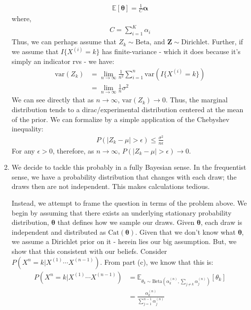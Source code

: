 \documentclass[submit]{harvardml}
\newcommand{\E}{\mathbb{E}}
\newcommand{\var}{\text{var}}
\newcommand{\Dir}{\text{Dirichlet}}
\newcommand{\Cat}{\text{Cat}}
\renewcommand{\v}{\boldsymbol}
\begin{document}
\begin{enumerate}[label=(\alph*)]
	\begin{align*}
		\E \left[ \v{\theta} \right] = \frac{1}{C} \v{\alpha} 
	\end{align*}
	where, 
	\begin{align*}
		C = \sum_{i=1}^K{\alpha_i}
	\end{align*}
Thus, we can perhaps assume that $Z_k \sim \text{Beta}$, and $\v{Z} \sim \Dir$.
Further, if we assume that $I\{X^{(i)} = k \}$ has finite-variance - which it does because it's simply an indicator rvs -  we have:
	\begin{align*}
		\var(Z_k) &= \lim_{n\rightarrow \infty} \frac{1}{n^2} \sum_{i=1}^{n} \var(I\{X^{(i)} = k \}) \\
				&= \lim_{n\rightarrow \infty} \frac{1}{n} \sigma^2
	\end{align*}
	We can see directly that as $n \rightarrow \infty$, $\var(Z_k) \rightarrow 0$. Thus, the marginal distribution tends to a dirac/experimental distribution centered at the mean of the prior. We can formalize by a simple application of the Chebyshev inequality:
	\begin{align*}
		P(\vert Z_k - \mu \vert > \epsilon) \leq \frac{\sigma^2}{n \epsilon}
	\end{align*}
	For any $\epsilon > 0$, therefore, as $n \rightarrow \infty$, $P(\vert Z_k - \mu \vert > \epsilon)  \rightarrow 0$.

	\item We decide to tackle this probably in a fully Bayesian sense. In the frequentist sense, we have a probability distribution that changes with each draw; the draws then are not independent. This makes calculations tedious.

Instead, we attempt to frame the question in terms of the problem above. We begin by assuming that there exists an underlying stationary probability distribution, $\v{\theta}$ that defines how we sample our draws. Given $\v \theta$, each draw is independent and distributed as $\Cat(\v \theta)$. Given that we don't know what $\v{\theta}$, we assume a Dirichlet prior on it - herein lies our big assumption. But, we show that this consistent with our beliefs. Consider $P(X^{n} = k | X^{(1)} \cdots X^{(n-1)})$. From part (c), we know that this is:
		\begin{align*}
				P(X^{n} = k | X^{(1)} \cdots X^{(n-1)}) &= \E_{\theta_k \sim \text{Beta}\left(\alpha^{(n)}_k, \sum_{j \neq k} \alpha^{(n)}_j \right)} \left[\theta_k \right] \\
			&= \frac{\alpha^{(n)}_k}{\sum_{j=1}^{n-1} \alpha^{(n)}_j} 
		\end{align*}
		

\end{enumerate}
\end{document}
